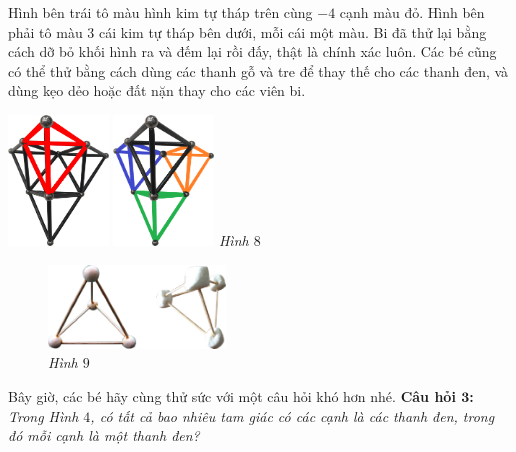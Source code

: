 	\begin{multicols}{2}
		Hình bên trái tô màu hình kim tự tháp trên cùng $- 4$ cạnh màu đỏ. Hình bên phải tô màu $3$ cái kim tự tháp bên dưới, mỗi cái một màu.
		\vskip 0.1cm
		Bi đã thử lại bằng cách dỡ bỏ khối hình ra và đếm lại rồi đấy, thật là chính xác luôn. Các bé cũng có thể thử bằng cách dùng các thanh gỗ và tre để thay thế cho các thanh đen, và dùng kẹo dẻo hoặc đất nặn thay cho các viên bi.
		\begin{center}
			\centering
			\vspace*{-10pt}
			\captionsetup{labelformat= empty, justification=centering} \includegraphics[width=0.2\textwidth]{8}\quad
			\includegraphics[width=0.2\textwidth]{8a}
			\textit{\small Hình $8$}
		\end{center}
	\begin{figure}[H]
		\centering
		\vspace*{-15pt}
		\captionsetup{labelformat= empty, justification=centering} \includegraphics[width=0.42\textwidth]{9}
		\caption{\small\textit{Hình $9$}}
		\vspace*{-5pt}
	\end{figure}
	\end{multicols}
	\vspace*{-5pt}
	Bây giờ, các bé hãy cùng thử sức với một câu hỏi khó hơn nhé.
	\vskip 0.1cm
	\textbf{\color{toancuabi}Câu hỏi $\pmb{3}$:} \textit{Trong Hình $4$, có tất cả bao nhiêu tam giác có các cạnh là các thanh đen, trong đó mỗi cạnh là một thanh đen?}

